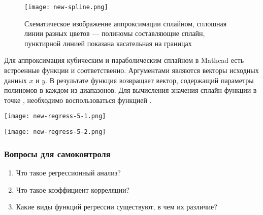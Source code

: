\begin{figure}[h] %
	\begin{center} 
		\texttt{[image: new-spline.png]}
	\end{center}
	\caption{Схематическое изображение аппроксимации сплайном, сплошная линии разных цветов --- полиномы составляющие сплайн, пунктирной линией показана касательная на границах }\label{fig:old.regress.spline}
\end{figure}

Для аппроксимация кубическим и параболическим сплайном в Mathcad есть встроенные функции  и  соответственно. Аргументами являются векторы исходных данных $x$ и $y$. В результате функция возвращает вектор, содержащий параметры полиномов в каждом из диапазонов. Для вычисления значения сплайн функции в точке , необходимо воспользоваться функцией .


\begin{center}
	\texttt{[image: new-regress-5-1.png]}
\end{center}

\begin{center}
	\texttt{[image: new-regress-5-2.png]}
\end{center}

\subsubsection*{Вопросы для самоконтроля}
\begin{enumerate}
	\item Что такое регрессионный анализ?
	\item Что такое коэффициент корреляции?
	\item Какие виды функций регрессии существуют, в чем их различие?
\end{enumerate}


